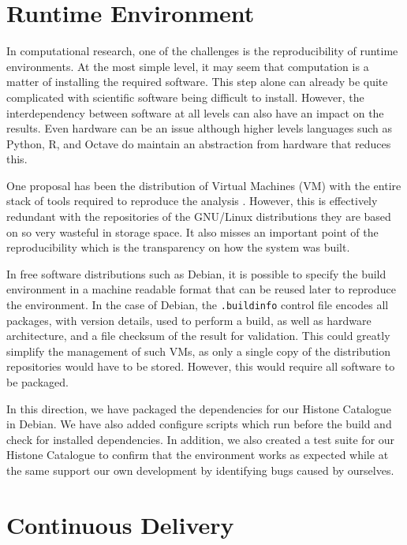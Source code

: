 \section{Runtime Environment}

In computational research, one of the challenges
is the reproducibility of
runtime environments.  At the most simple level, it may seem that
computation is a
matter of installing the required software.  This step alone can
already be quite complicated with scientific software being difficult
to install.
However, the
interdependency between software at all levels can also have an impact on
the results.  Even hardware can be an issue although higher levels
languages such as Python, R, and Octave do maintain an abstraction from
hardware that reduces this.

One proposal has been the distribution of Virtual Machines (VM) with
the entire stack of tools required to reproduce the
analysis \citep{hurley2015virtual, angiuoli2011clovr}.
However, this is effectively redundant with
the repositories of the GNU/Linux distributions they are based on so
very wasteful in storage space.  It also misses an important point of
the reproducibility which is the transparency on how the system was built.

In free software distributions such as Debian, it is possible to
specify the build environment in a machine readable format that can be
reused later to reproduce the environment.  In the case of Debian,
the \texttt{.buildinfo} control file encodes all packages, with
version details, used to perform a build, as well as hardware
architecture, and a file checksum of the result for validation.  This
could greatly simplify the management of such VMs, as only a single
copy of the distribution repositories would have to be stored.
However, this would require all software to be packaged.

In this direction, we have packaged the dependencies for our Histone
Catalogue in Debian.  We have also added configure scripts which run
before the build and check for installed dependencies.  In addition,
we also created a test suite for our Histone Catalogue to confirm that
the environment works as expected while at the same support our own
development by identifying bugs caused by ourselves.

\section{Continuous Delivery}

